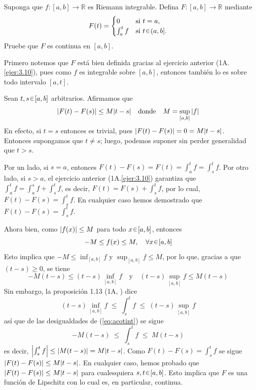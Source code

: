
\setcounter{eje}{10} %
\begin{ejer}
Suponga que $f\colon [a, b] \to \mathbb{R}$ es Riemann integrable. Defina $F\colon [a, b] \to \mathbb{R}$ mediante
$$
F(t) = \begin{cases} 
0 & \text{si } t = a, \\
\int_a^t f & \text{si } t \en (a, b].
\end{cases}
$$
Pruebe que $F$ es continua en $[a, b]$.
\end{ejer}
\begin{sol}
Primero notemos que $F$ está bien definida gracias al ejercicio anterior (1A.\ref{ejer:3.10}), pues como $f$ es integrable sobre $[a,b]$, entonces también lo es sobre todo intervalo $[a,t]$.\par
Sean $t,s\en[a,b]$ arbitrarios. Afirmamos que 
\[
\abs{F(t) - F(s)} \leq M\abs{t-s}%
\quad\text{donde}\quad
M = \sup_{[a,b]}\abs{f}
\]
En efecto, si $t=s$ entonces es trivial, pues $\abs{F(t) - F(s)} = 0 = M\abs{t-s}$. Entonces supongamos que $t \neq s$; luego, podemos suponer sin perder generalidad que $t>s$.\par
Por un lado, si $s=a$, entonces $F(t) - F(s) = F(t) = \int^t_af = \int^t_sf$. Por otro lado, si $s > a$, el ejercicio anterior (1A.\ref{ejer:3.10}) garantiza que $\int^t_a f = \int^s_a f + \int^t_s f$, es decir, $F(t) = F(s) + \int^t_s f$, por lo cual, $F(t) - F(s) = \int^t_s f$. En cualquier caso hemos demostrado que $F(t) - F(s) = \int^t_s f$.\par
Ahora bien, como $\abs{f(x)} \leq M$ para todo $x\en [a,b]$, entonces
\[
-M \leq f(x) \leq M,%
\quad\forall x\en[a,b]
\]
Esto implica que $-M \leq \inf_{[a,b]}f$ y $\sup_{[a,b]} f \leq M$, por lo que, gracias a que $(t-s) \geq 0$, se tiene
\begin{equation}\label{eq:acotint}
-M(t-s) \leq (t-s)\inf_{[a,b]}f
\quad\text{y}\quad
(t-s)\sup_{[a,b]} f \leq M(t-s)
\end{equation}
Sin embargo, la proposición 1.13 (1A, \cite{Axler}) dice
\[
{(t-s)\inf_{[a,b]} f} \;\leq\; {\int^t_s f} \;\leq\; {(t-s)\sup_{[a,b]}f}
\]
así que de las desigualdades de (\ref{eq:acotint}) se sigue
\[
{-M(t-s)} \;\leq\; {\int^t_s f} \;\leq\; {M(t-s)}
\]
es decir, $\abs{\int^t_s f} \leq \abs{M(t-s)} = M|t-s|$. Como $F(t) - F(s) = \int^t_sf$ se sigue $\abs{F(t) - F(s)} \leq  M|t-s|$. En cualquier caso, hemos probado que $\abs{F(t) - F(s)} \leq  M|t-s|$ para cualesquiera $s,t\en[a,b]$. Esto implica que $F$ es una función de Lipschitz con lo cual es, en particular, continua.

\end{sol}
